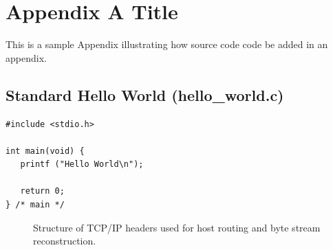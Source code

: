 \chapter{Appendix A Title}%


This is a sample Appendix illustrating how source code code be added
in an appendix.

\section{Standard Hello World (hello\_world.c)}

{\footnotesize\renewcommand{\baselinestretch}{1.0}
\begin{verbatim}
#include <stdio.h>

int main(void) {
   printf ("Hello World\n");

   return 0;
} /* main */
\end{verbatim}}

\begin{figure}
    \caption[Structure of TCP/IP headers]{Structure of TCP/IP headers used for host
    routing and byte stream reconstruction.}
    \label{c2:f1}
\end{figure}
